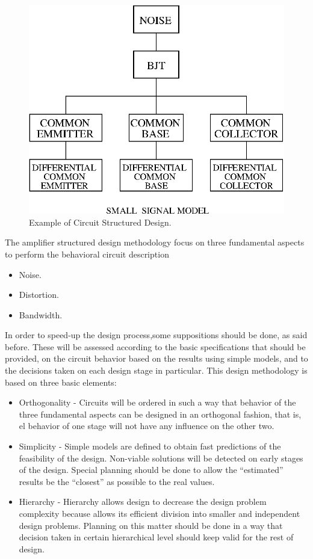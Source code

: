 \documentclass[twocolumn]{IEEEtran}
\begin{document}
\begin{figure}[hbtp]
	\centering
	\includegraphics[scale=.65]{figures/bloque_ruido.eps}
	\caption{Example of Circuit Structured Design.}
	\label{fig:sd_1}
\end{figure}

The amplifier structured design methodology focus on three fundamental aspects to perform the behavioral circuit description

\begin{itemize}
\item Noise.
\item Distortion.
\item Bandwidth.
\end{itemize}

In order to speed-up the design process,some suppositions should be done, as said before. These will be assessed according to the basic specifications that should be provided, on the circuit behavior based on the results using simple models, and to the decisions taken on each design stage in particular. This design methodology is based on three basic elements: 

\begin{itemize}
\item Orthogonality - Circuits will be ordered in such a way that behavior of the three fundamental aspects can be designed in an orthogonal fashion, that is, el behavior of one stage will not have any influence on the other two.
\item Simplicity - Simple models are defined to obtain fast predictions of the feasibility of the design. Non-viable solutions will be detected on early stages of the design. Special planning should be done to allow the ``estimated'' results be the ``closest'' as possible to the real values.
\item Hierarchy - Hierarchy allows design to decrease the design problem complexity because allows its efficient division into smaller and independent design problems. Planning on this matter should be done in a way that decision taken in certain hierarchical level should keep valid for the rest of design.
\end{itemize}
\end{document}

